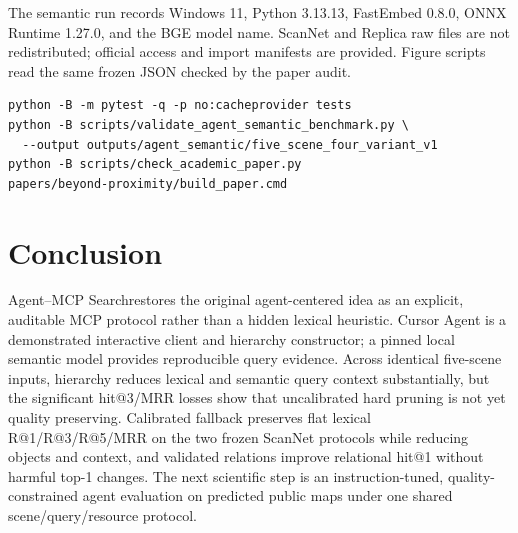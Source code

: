 \documentclass[10pt,twocolumn,letterpaper]{article}
\newcommand{\method}{Agent--MCP Search}
\begin{document}
The semantic run records Windows 11, Python 3.13.13, FastEmbed 0.8.0,
ONNX Runtime 1.27.0, and the BGE model name. ScanNet and Replica raw files are
not redistributed; official access and import manifests are provided. Figure
scripts read the same frozen JSON checked by the paper audit.

\noindent\begin{minipage}{\linewidth}
\begin{lstlisting}[style=commandblock]
python -B -m pytest -q -p no:cacheprovider tests
python -B scripts/validate_agent_semantic_benchmark.py \
  --output outputs/agent_semantic/five_scene_four_variant_v1
python -B scripts/check_academic_paper.py
papers/beyond-proximity/build_paper.cmd
\end{lstlisting}
\end{minipage}

\section{Conclusion}
\method restores the original agent-centered idea as an explicit, auditable
MCP protocol rather than a hidden lexical heuristic. Cursor Agent is a
demonstrated interactive client and hierarchy constructor; a pinned local
semantic model provides reproducible query evidence. Across identical
five-scene inputs, hierarchy reduces lexical and semantic query context
substantially, but the significant hit@3/MRR losses show that uncalibrated hard
pruning is not yet quality preserving. Calibrated fallback preserves flat
lexical R@1/R@3/R@5/MRR on the two frozen ScanNet protocols while reducing
objects and context, and validated relations improve relational hit@1 without
harmful top-1 changes. The next scientific step is an instruction-tuned,
quality-constrained agent evaluation on predicted public maps under one shared
scene/query/resource protocol.

\balance
{\fontsize{6.3}{6.5}\selectfont


}
\end{document}
